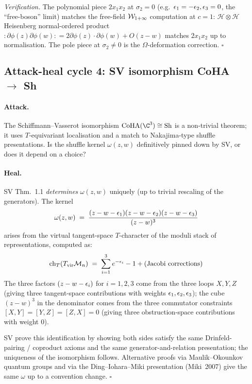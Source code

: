 \emph{Verification.} The polynomial piece $2 x_1 x_2$ at $\sigma_2 = 0$
(e.g.\ $\epsilon_1 = -\epsilon_2, \epsilon_3 = 0$, the ``free-boson'' limit) matches the
free-field $\mathcal{W}_{1+\infty}$ computation at $c = 1$: $\mathcal{H} \otimes \mathcal{H}$
Heisenberg normal-ordered product $:\partial \phi(z) \partial \phi(w): = 2 \partial \phi(z)
\cdot \partial \phi(w) + O(z - w)$ matches $2 x_1 x_2$ up to normalisation.
The pole piece at $\sigma_2 \neq 0$ is the $\Omega$-deformation correction.
\hfill$\square$

\subsection{Attack-heal cycle 4: SV isomorphism CoHA $\to$ Sh}
\label{opus:sec:ah-4-sv-iso}

\paragraph{Attack.}
The Schiffmann--Vasserot isomorphism $\CoHA(\C^3) \cong \Sh$ is a non-trivial theorem;
it uses $T$-equivariant localisation and a match to Nakajima-type shuffle presentations.
Is the shuffle kernel $\omega(z, w)$ definitively pinned down by SV, or does it depend
on a choice?

\paragraph{Heal.}
SV Thm.~1.1 \emph{determines} $\omega(z, w)$ uniquely (up to trivial rescaling of the
generators). The kernel
\[
 \omega(z, w) \;=\; \frac{(z - w - \epsilon_1)(z - w - \epsilon_2)(z - w - \epsilon_3)}{(z - w)^3}
\]
arises from the virtual tangent-space $T$-character of the moduli stack of
representations, computed as:
\[
 \mathrm{ch}_T(T_{\mathrm{vir}}\mathcal{M}_n) \;=\; \sum_{i=1}^{3} e^{-\epsilon_i} - 1 + \text{(Jacobi corrections)}
\]
The three factors $(z - w - \epsilon_i)$ for $i = 1, 2, 3$ come from the three loops $X, Y, Z$
(giving three tangent-space contributions with weights $\epsilon_1, \epsilon_2, \epsilon_3$); the
cube $(z - w)^3$ in the denominator comes from the three commutator constraints
$[X, Y] = [Y, Z] = [Z, X] = 0$ (giving three obstruction-space contributions with
weight $0$).

SV prove this identification by showing both sides satisfy the same Drinfeld-pairing
/ coproduct axioms and the same generator-and-relation presentation;
the uniqueness of the isomorphism follows.
Alternative proofs via Maulik--Okounkov quantum groups and via the Ding--Iohara--Miki
presentation (Miki~2007) give the same $\omega$ up to a convention change.
\hfill$\square$

